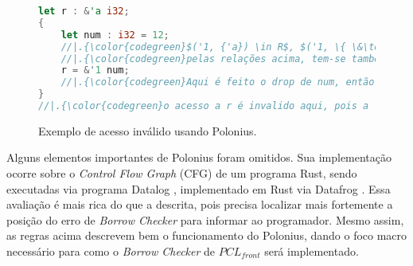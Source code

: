 \begin{figure}[ht]
	\caption{Exemplo de acesso inválido usando Polonius. }
	\label{fig:ex:polonius:2}
	\begin{lstlisting}[language=Rust]
let r : &'a i32;
{
	let num : i32 = 12;
	//|.{\color{codegreen}$('1, {'a}) \in R$, $('1, \{ \&\text{num} \}) \in L$}.
	//|.{\color{codegreen}pelas relações acima, tem-se também que $('a, \{ \&\text{num} \}) \in L$}.
	r = &'1 num; 
	//|.{\color{codegreen}Aqui é feito o drop de num, então invalida-se a concessão \&num}.
}
//|.{\color{codegreen}o acesso a r é invalido aqui, pois a 'a está não está viva $\forall ls \subseteq Loans,('a, ls) \notin L$}

	\end{lstlisting}
\end{figure}


Alguns elementos importantes de Polonius foram omitidos. Sua implementação ocorre sobre o \emph{Control Flow Graph} (CFG) de um programa Rust, sendo executadas via programa Datalog \cite{DATALOG}, implementado em Rust via Datafrog \cite{DATAFROG}. Essa avaliação é mais rica do que a descrita, pois precisa localizar mais fortemente a posição do erro de \emph{Borrow Checker} para informar ao programador. Mesmo assim, as regras acima descrevem bem o funcionamento do Polonius, dando o foco macro necessário para como o \emph{Borrow Checker} de $PCL_{front}$ será implementado.

